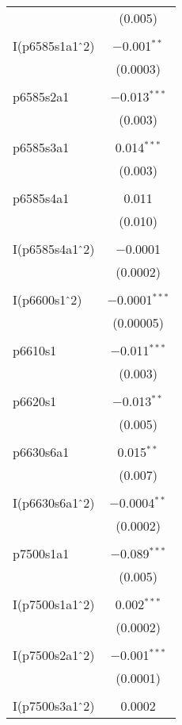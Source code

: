 \begin{table}[H]
{\begin{tabular}{@{\extracolsep{5pt}}lc}
  & (0.005) \\ 
  & \\ 
 I(p6585s1a1$\hat{\mkern6mu}$2) & $-$0.001$^{**}$ \\ 
  & (0.0003) \\ 
  & \\ 
 p6585s2a1 & $-$0.013$^{***}$ \\ 
  & (0.003) \\ 
  & \\ 
 p6585s3a1 & 0.014$^{***}$ \\ 
  & (0.003) \\ 
  & \\ 
 p6585s4a1 & 0.011 \\ 
  & (0.010) \\ 
  & \\ 
 I(p6585s4a1$\hat{\mkern6mu}$2) & $-$0.0001 \\ 
  & (0.0002) \\ 
  & \\ 
 I(p6600s1$\hat{\mkern6mu}$2) & $-$0.0001$^{***}$ \\ 
  & (0.00005) \\ 
  & \\ 
 p6610s1 & $-$0.011$^{***}$ \\ 
  & (0.003) \\ 
  & \\ 
 p6620s1 & $-$0.013$^{**}$ \\ 
  & (0.005) \\ 
  & \\ 
 p6630s6a1 & 0.015$^{**}$ \\ 
  & (0.007) \\ 
  & \\ 
 I(p6630s6a1$\hat{\mkern6mu}$2) & $-$0.0004$^{**}$ \\ 
  & (0.0002) \\ 
  & \\ 
 p7500s1a1 & $-$0.089$^{***}$ \\ 
  & (0.005) \\ 
  & \\ 
 I(p7500s1a1$\hat{\mkern6mu}$2) & 0.002$^{***}$ \\ 
  & (0.0002) \\ 
  & \\ 
 I(p7500s2a1$\hat{\mkern6mu}$2) & $-$0.001$^{***}$ \\ 
  & (0.0001) \\ 
  & \\ 
 I(p7500s3a1$\hat{\mkern6mu}$2) & 0.0002 \\ 

\end{tabular}}
\end{table}

